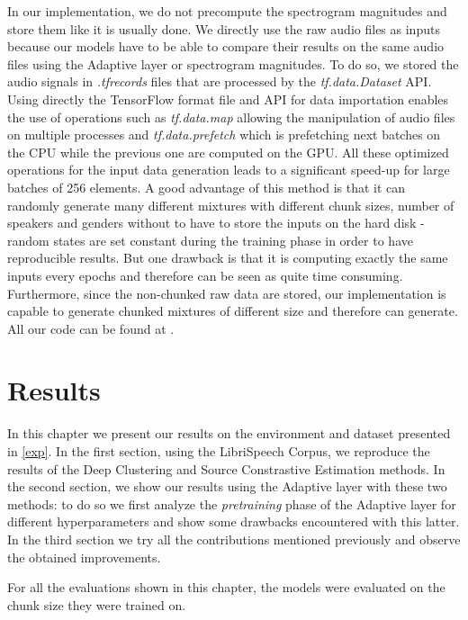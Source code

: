 \documentclass[master, tikz, final,11pt, dvipdfmx]{iscs-thesis}
\begin{document}
In our implementation, we do not precompute the spectrogram magnitudes and store them like it is usually done. We directly use the raw audio files as inputs because our models have to be able to compare their results on the same audio files using the Adaptive layer or spectrogram magnitudes. To do so, we stored the audio signals in \textit{.tfrecords} files that are processed by the \textit{tf.data.Dataset} API. Using directly the TensorFlow format file and API for data importation enables the use of operations such as \textit{tf.data.map} allowing the manipulation of audio files on multiple processes and \textit{tf.data.prefetch} which is prefetching next batches on the CPU while the previous one are computed on the GPU.
All these optimized operations for the input data generation leads to a significant speed-up for large batches of 256 elements. A good advantage of this method is that it can randomly generate many different mixtures with different chunk sizes, number of speakers and genders without to have to store the inputs on the hard disk - random states are set constant during the training phase in order to have reproducible results. But one drawback is that it is computing exactly the same inputs every epochs and therefore can be seen as quite time consuming.
 Furthermore, since the non-chunked raw data are stored, our implementation is capable to generate chunked mixtures of different size and therefore can generate. All our code can be found at \cite{github}.

\chapter{Results}
\label{res}

In this chapter we present our results on the environment and dataset presented in \autoref{exp}.
In the first section, using the LibriSpeech Corpus, we reproduce the results of the Deep Clustering and Source Constrastive Estimation methods. In the second section, we show our results using the Adaptive layer with these two methods: to do so we first analyze the \textit{pretraining} phase of the Adaptive layer for different hyperparameters and show some drawbacks encountered with this latter. In the third section we try all the contributions mentioned previously and observe the obtained improvements.

For all the evaluations shown in this chapter, the models were evaluated on the chunk size they were trained on.
 
\end{document}
